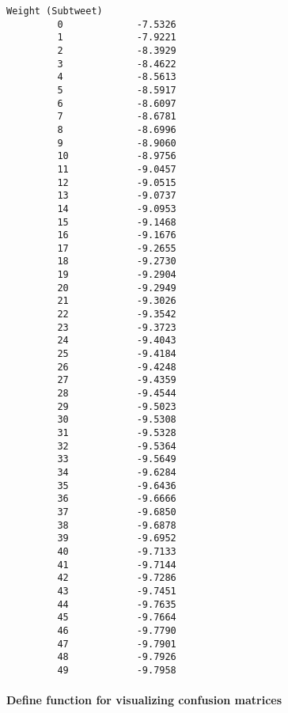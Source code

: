 \documentclass[11pt]{article}
\begin{document}
\begin{Verbatim}[commandchars=\\\{\}]
             Weight (Subtweet)  
         0             -7.5326  
         1             -7.9221  
         2             -8.3929  
         3             -8.4622  
         4             -8.5613  
         5             -8.5917  
         6             -8.6097  
         7             -8.6781  
         8             -8.6996  
         9             -8.9060  
         10            -8.9756  
         11            -9.0457  
         12            -9.0515  
         13            -9.0737  
         14            -9.0953  
         15            -9.1468  
         16            -9.1676  
         17            -9.2655  
         18            -9.2730  
         19            -9.2904  
         20            -9.2949  
         21            -9.3026  
         22            -9.3542  
         23            -9.3723  
         24            -9.4043  
         25            -9.4184  
         26            -9.4248  
         27            -9.4359  
         28            -9.4544  
         29            -9.5023  
         30            -9.5308  
         31            -9.5328  
         32            -9.5364  
         33            -9.5649  
         34            -9.6284  
         35            -9.6436  
         36            -9.6666  
         37            -9.6850  
         38            -9.6878  
         39            -9.6952  
         40            -9.7133  
         41            -9.7144  
         42            -9.7286  
         43            -9.7451  
         44            -9.7635  
         45            -9.7664  
         46            -9.7790  
         47            -9.7901  
         48            -9.7926  
         49            -9.7958  
\end{Verbatim}
            
    \paragraph{Define function for visualizing confusion
matrices}\label{define-function-for-visualizing-confusion-matrices}
\end{document}
